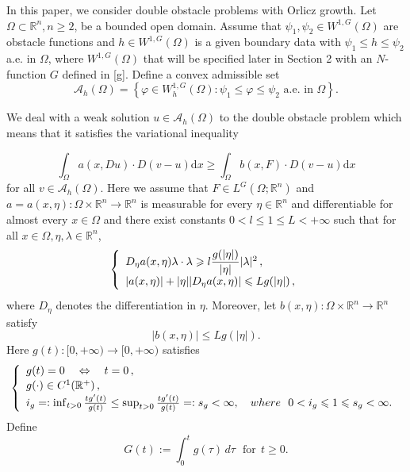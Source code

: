 \documentclass[10pt,a4paper]{article}
\theoremstyle{definition}
\numberwithin{equation}{section}
\begin{document}
 In this paper, we consider double obstacle problems with Orlicz growth.
Let $\Omega \subset \mathbb{R}^{n}, n \geq 2$, be a bounded open domain. Assume that   $\psi_{1}, \psi_{2} \in W^{1, G}(\Omega)$ are obstacle functions   and $h\in W^{1, G}(\Omega)$ is a given boundary data with $\psi_{1} \leq h \leq \psi_{2}$ a.e. in $\Omega$, where $W^{1, G}(\Omega)$ that will be specified later in Section 2 with an $N$-function $G$ defined in \eqref{g}.
Define a convex admissible set
$$
\mathcal{A}_{h}(\Omega)=\left\{\varphi \in W_{h}^{1, G}(\Omega): \psi_{1} \leq \varphi \leq \psi_{2} \text { a.e. in } \Omega\right\} .
$$

We deal with a weak solution $u \in \mathcal{A}_{h}(\Omega)$ to the double obstacle problem which means that it satisfies the variational inequality
 
\begin{equation}\label{u}
	\int_{\Omega}  a(x, D u) \cdot D(v-u) \mathrm{d} x \geqslant \int_{\Omega} b(x, F ) \cdot D(v-u) \mathrm{d} x  
\end{equation}
for all $v \in \mathcal{A}_{h}(\Omega)$. Here we
assume that $F \in L^G(\Omega;\mathbb{R}^n)$ and  $a=a(x,\eta): \Omega \times\mathbb{R}^n \rightarrow \mathbb{R}^n$ is measurable for every $\eta \in \mathbb{R}^n$  and differentiable for almost every $x\in \Omega$  and there exist constants $0<l\leqslant 1 \leqslant L<+\infty$ such that for all $x \in \Omega,\eta,\lambda \in \mathbb{R}^n$,   
\begin{eqnarray} \label{u1}
	\left\{\begin{array}{r@{}c@{}ll}
		&&D_{\eta} a(x,\eta )\lambda \cdot \lambda \geqslant l\dfrac{g(|\eta|)}{|\eta|}|\lambda|^2 \,, \\[0.05cm]
		&&|a(x,\eta)|+|\eta||D_{\eta} a(x,\eta )|\leqslant Lg(|\eta|)\,, \\[0.05cm]
	\end{array}\right.
\end{eqnarray}
where $D_{\eta}$ denotes the differentiation in $\eta$.  
Moreover, let $b(x,\eta): \Omega \times\mathbb{R}^n \rightarrow \mathbb{R}^n$  satisfy
\begin{equation}\label{u2}
	|b(x,\eta)|\leqslant L g(|\eta|).
\end{equation}
Here $g(t) : [0,+\infty)\rightarrow [0,+\infty)$ satisfies
\begin{eqnarray}\label{u3}
	\left\{\begin{array}{r@{}c@{}ll}
		&&g(t)=0 \ \ \ \Leftrightarrow \ \ \   t=0 \,, \\[0.05cm]
		&&g(\cdot)\in C^{1}(\mathbb{R}^+)\,, \\[0.05cm]
		&&   i_{g}=: \inf_{t>0}\frac{tg'(t)}{g(t)}\leq \sup_{t>0}\frac{tg'(t)}{g(t)}=:s_{g}<\infty, \ \ \  where \ \  0< i_{g} \leqslant 1 \leqslant s_{g} <\infty. \, \\[0.05cm]
	\end{array}\right.
\end{eqnarray}
Define
\begin{equation}\label{g}
	G(t):= \int_0^tg(\tau)\,d\tau  \ \ \ \mbox{for}\ \ t\geq0.
\end{equation}
\end{document}
